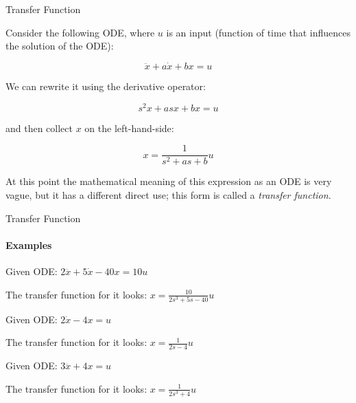 \documentclass{beamer}
\begin{document}
\begin{frame}{Transfer Function}
\begin{flushleft}

Consider the following ODE, where $u$ is an input (function of time that influences the solution of the ODE):

\begin{equation}
\ddot x + a \dot x + b x = u
\end{equation}

We can rewrite it using the derivative operator:

\begin{equation}
s^2 x + a s x + b x = u
\end{equation}

and then collect $x$ on the left-hand-side:

\begin{equation}
x = \frac{1}{s^2 + a s + b} u
\end{equation}

At this point the mathematical meaning of this expression as an ODE is very vague, but it has a different direct use; this form is called a \emph{transfer function}.

\end{flushleft}
\end{frame}


\begin{frame}{Transfer Function}
\framesubtitle{Examples}
\begin{flushleft}

\begin{example}
Given ODE: $2 \dddot x + 5\dot x - 40 x = 10 u$

The transfer function for it looks: 
$x = \frac{10}{2 s^3 + 5 s - 40} u$
\end{example}


\begin{example}
Given ODE: $2 \dot x - 4 x = u$

The transfer function for it looks: $x = \frac{1}{2 s - 4} u$
\end{example}


\begin{example}
Given ODE: $3 \dddot x + 4x = u$

The transfer function for it looks: $x = \frac{1}{2 s^3 + 4} u$
\end{example}

\end{flushleft}
\end{frame}
\end{document}
